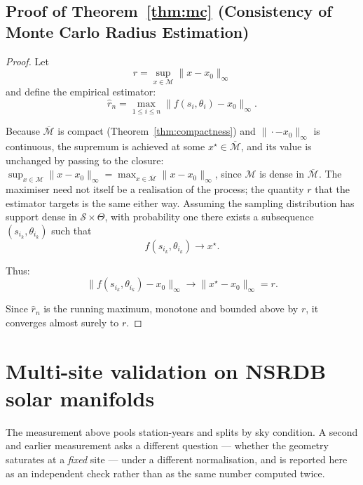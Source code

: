 \documentclass[10pt]{article}
\theoremstyle{plain}
\theoremstyle{definition}
\theoremstyle{remark}
\begin{document}
\subsection{Proof of Theorem~\ref{thm:mc} (Consistency of Monte Carlo Radius Estimation)}

\begin{proof}
Let 
\[
r = \sup_{x\in\mathcal{M}} \|x - x_0\|_\infty
\]
and define the empirical estimator:
\[
\hat{r}_n = \max_{1\le i \le n} \|f(s_i,\theta_i) - x_0\|_\infty.
\]

Because $\overline{\mathcal{M}}$ is compact
(Theorem~\ref{thm:compactness}) and $\|\cdot - x_0\|_\infty$ is continuous,
the supremum is achieved at some $x^\star \in \overline{\mathcal{M}}$, and its
value is unchanged by passing to the closure:
$\sup_{x\in\mathcal{M}} \|x-x_0\|_\infty
= \max_{x\in\overline{\mathcal{M}}} \|x-x_0\|_\infty$, since
$\mathcal{M}$ is dense in $\overline{\mathcal{M}}$. The maximiser need not
itself be a realisation of the process; the quantity $r$ that the estimator
targets is the same either way.
Assuming the sampling distribution has support dense in 
$\mathcal{S}\times\Theta$, with probability one there exists a subsequence 
$(s_{i_k},\theta_{i_k})$ such that
\[
f(s_{i_k},\theta_{i_k}) \to x^\star.
\]

Thus:
\[
\|f(s_{i_k},\theta_{i_k}) - x_0\|_\infty \to \|x^\star - x_0\|_\infty = r.
\]

Since $\hat{r}_n$ is the running maximum, monotone and bounded above by $r$,
it converges almost surely to $r$.
\end{proof}



\section{Multi-site validation on NSRDB solar manifolds}\label{app:solar_multisite}



The measurement above pools station-years and splits by sky condition. A second
and earlier measurement asks a different question --- whether the geometry
saturates at a \emph{fixed} site --- under a different normalisation, and is
reported here as an independent check rather than as the same number computed
twice.
\end{document}
